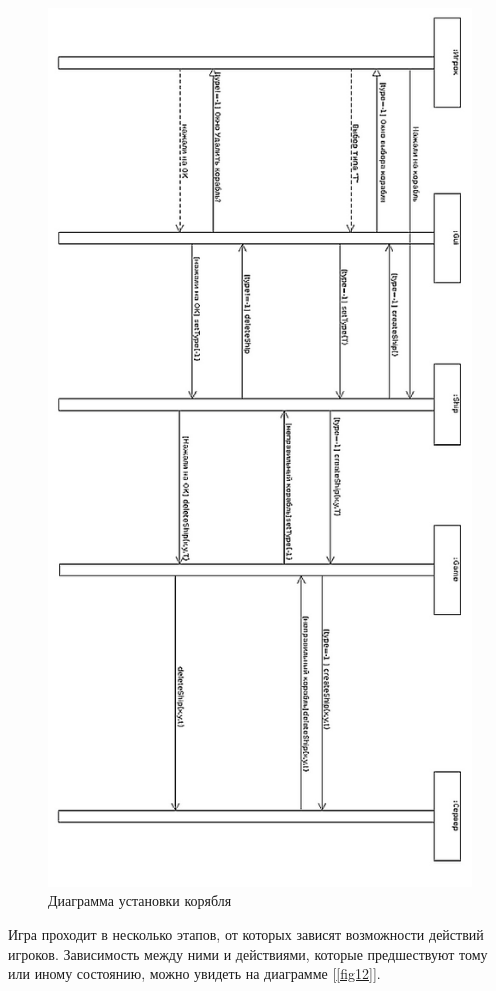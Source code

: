 \begin{figure}[pt]
\centering
\includegraphics[width=12cm]{images/CRS.png}
\caption{Диаграмма установки корябля}
\label{fig11}
\end{figure}

Игра проходит в несколько этапов, от которых зависят возможности действий игроков. Зависимость между ними и действиями, которые предшествуют тому или иному состоянию, можно увидеть на диаграмме [\ref{fig12}].

